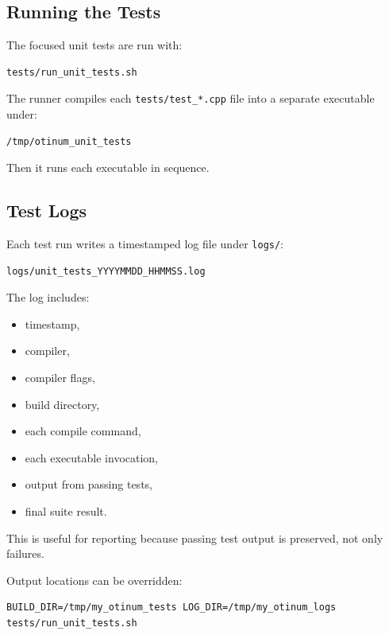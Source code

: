 \documentclass[11pt]{article}
\begin{document}
\subsection{Running the Tests}

The focused unit tests are run with:

\begin{lstlisting}[style=shellstyle]
tests/run_unit_tests.sh
\end{lstlisting}

The runner compiles each \texttt{tests/test\_*.cpp} file into a separate
executable under:

\begin{lstlisting}[style=shellstyle]
/tmp/otinum_unit_tests
\end{lstlisting}

Then it runs each executable in sequence.

\subsection{Test Logs}

Each test run writes a timestamped log file under \texttt{logs/}:

\begin{lstlisting}[style=shellstyle]
logs/unit_tests_YYYYMMDD_HHMMSS.log
\end{lstlisting}

The log includes:

\begin{itemize}[noitemsep]
    \item timestamp,
    \item compiler,
    \item compiler flags,
    \item build directory,
    \item each compile command,
    \item each executable invocation,
    \item output from passing tests,
    \item final suite result.
\end{itemize}

This is useful for reporting because passing test output is preserved, not
only failures.

Output locations can be overridden:

\begin{lstlisting}[style=shellstyle]
BUILD_DIR=/tmp/my_otinum_tests LOG_DIR=/tmp/my_otinum_logs tests/run_unit_tests.sh
\end{lstlisting}
\end{document}
